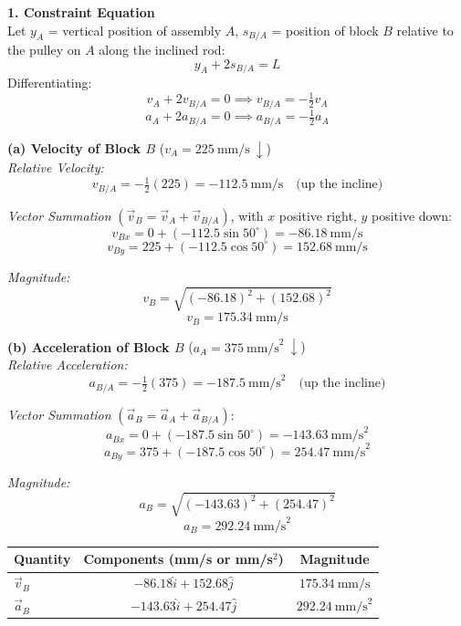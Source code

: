 \documentclass[12pt,a3paper]{article}
\begin{document}
\begin{enumerate}
\begin{tcolorbox}[enhanced,breakable,ansbox,colback=cF!4,colframe=cF,
  boxrule=0.8pt,arc=5pt,
  title={\textbf{Solution}},fonttitle=\bfseries\color{white},
  colbacktitle=cF]
\textbf{1. Constraint Equation}\\[4pt]
Let $y_A$ = vertical position of assembly $A$, $s_{B/A}$ = position of
block $B$ relative to the pulley on $A$ along the inclined rod:
\[
  y_A + 2s_{B/A} = L
\]
Differentiating:
\[
  v_A + 2v_{B/A} = 0 \implies v_{B/A} = -\tfrac{1}{2}v_A
\]
\[
  a_A + 2a_{B/A} = 0 \implies a_{B/A} = -\tfrac{1}{2}a_A
\]

\medskip
\textbf{(a) Velocity of Block $B$} \quad ($v_A = 225\ \text{mm/s}\ \downarrow$)\\[4pt]

\textit{Relative Velocity:}
\[
  v_{B/A} = -\tfrac{1}{2}(225) = -112.5\ \text{mm/s}
  \quad \text{(up the incline)}
\]

\textit{Vector Summation} $(\vec{v}_B = \vec{v}_A + \vec{v}_{B/A})$,
with $x$ positive right, $y$ positive down:
\[
  v_{Bx} = 0 + (-112.5\sin50^\circ) = -86.18\ \text{mm/s}
\]
\[
  v_{By} = 225 + (-112.5\cos50^\circ) = 152.68\ \text{mm/s}
\]

\textit{Magnitude:}
\[
  v_B = \sqrt{(-86.18)^2 + (152.68)^2}
\]
\[
  \boxed{v_B = 175.34\ \text{mm/s}}
\]

\medskip
\textbf{(b) Acceleration of Block $B$} \quad ($a_A = 375\ \text{mm/s}^2\ \downarrow$)\\[4pt]

\textit{Relative Acceleration:}
\[
  a_{B/A} = -\tfrac{1}{2}(375) = -187.5\ \text{mm/s}^2
  \quad \text{(up the incline)}
\]

\textit{Vector Summation} $(\vec{a}_B = \vec{a}_A + \vec{a}_{B/A})$:
\[
  a_{Bx} = 0 + (-187.5\sin50^\circ) = -143.63\ \text{mm/s}^2
\]
\[
  a_{By} = 375 + (-187.5\cos50^\circ) = 254.47\ \text{mm/s}^2
\]

\textit{Magnitude:}
\[
  a_B = \sqrt{(-143.63)^2 + (254.47)^2}
\]
\[
  \boxed{a_B = 292.24\ \text{mm/s}^2}
\]

\medskip
\begin{center}
\renewcommand{\arraystretch}{1.4}
\begin{tabular}{lcc}
  \hline
  \textbf{Quantity} & \textbf{Components (mm/s or mm/s$^2$)} & \textbf{Magnitude} \\
  \hline
  $\vec{v}_B$ & $-86.18\hat{i} + 152.68\hat{j}$ & $175.34\ \text{mm/s}$ \\
  $\vec{a}_B$ & $-143.63\hat{i} + 254.47\hat{j}$ & $292.24\ \text{mm/s}^2$ \\
  \hline
\end{tabular}
\end{center}

\end{tcolorbox}


\end{enumerate}
\end{document}
